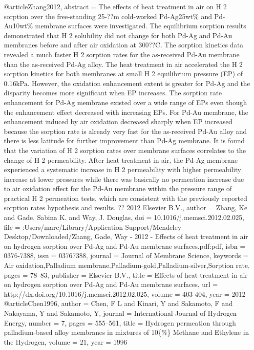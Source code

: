 @article{Zhang2012,
abstract = {The effects of heat treatment in air on H 2 sorption over the free-standing 25-??m cold-worked Pd-Ag25wt{\%} and Pd-Au10wt{\%} membrane surfaces were investigated. The equilibrium sorption results demonstrated that H 2 solubility did not change for both Pd-Ag and Pd-Au membranes before and after air oxidation at 300??C. The sorption kinetics data revealed a much faster H 2 sorption rates for the as-received Pd-Au membrane than the as-received Pd-Ag alloy. The heat treatment in air accelerated the H 2 sorption kinetics for both membranes at small H 2 equilibrium pressure (EP) of 0.16kPa. However, the oxidation enhancement extent is greater for Pd-Ag and the disparity becomes more significant when EP increases. The sorption rate enhancement for Pd-Ag membrane existed over a wide range of EPs even though the enhancement effect decreased with increasing EPs. For Pd-Au membrane, the enhancement induced by air oxidation decreased sharply when EP increased because the sorption rate is already very fast for the as-received Pd-Au alloy and there is less latitude for further improvement than Pd-Ag membrane. It is found that the variation of H 2 sorption rates over membrane surfaces correlates to the change of H 2 permeability. After heat treatment in air, the Pd-Ag membrane experienced a systematic increase in H 2 permeability with higher permeability increase at lower pressures while there was basically no permeation increase due to air oxidation effect for the Pd-Au membrane within the pressure range of practical H 2 permeation tests, which are consistent with the previously reported sorption rates hypothesis and results. ?? 2012 Elsevier B.V.},
author = {Zhang, Ke and Gade, Sabina K. and Way, J. Douglas},
doi = {10.1016/j.memsci.2012.02.025},
file = {:Users/marc/Library/Application Support/Mendeley Desktop/Downloaded/Zhang, Gade, Way - 2012 - Effects of heat treatment in air on hydrogen sorption over Pd-Ag and Pd-Au membrane surfaces.pdf:pdf},
isbn = {0376-7388},
issn = {03767388},
journal = {Journal of Membrane Science},
keywords = {Air oxidation,Palladium membrane,Palladium-gold,Palladium-silver,Sorption rate},
pages = {78--83},
publisher = {Elsevier B.V.},
title = {{Effects of heat treatment in air on hydrogen sorption over Pd-Ag and Pd-Au membrane surfaces}},
url = {http://dx.doi.org/10.1016/j.memsci.2012.02.025},
volume = {403-404},
year = {2012}
}
@article{Chen1996,
author = {Chen, F L and Kinari, Y and Sakamoto, F and Nakayama, Y and Sakamoto, Y},
journal = {International Journal of Hydrogen Energy},
number = {7},
pages = {555--561},
title = {{Hydrogen permeation through palladium-based alloy membranes in mixtures of 10{\{}{\%}{\}} Methane and Ethylene in the Hydrogen}},
volume = {21},
year = {1996}
}
